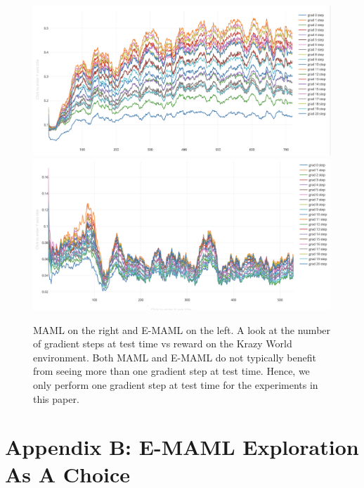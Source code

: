 \documentclass{article} %
\begin{document}
{\begin{figure}[H]
\begin{center}
\includegraphics[scale=0.16]{bradly_curves/emaml-20-0.png}%
\includegraphics[scale=0.16]{bradly_curves/maml-20-0.png}
\end{center}
\caption{MAML on the right and E-MAML on the left. A look at the number of gradient steps at test time vs reward on the Krazy World environment. Both MAML and E-MAML do not typically benefit from seeing more than one gradient step at test time. Hence, we only perform one gradient step at test time for the experiments in this paper.}
\label{fig:maml-grad-steps}
\end{figure} 


\section{Appendix B: E-MAML Exploration As A Choice} 

}
\end{document}
